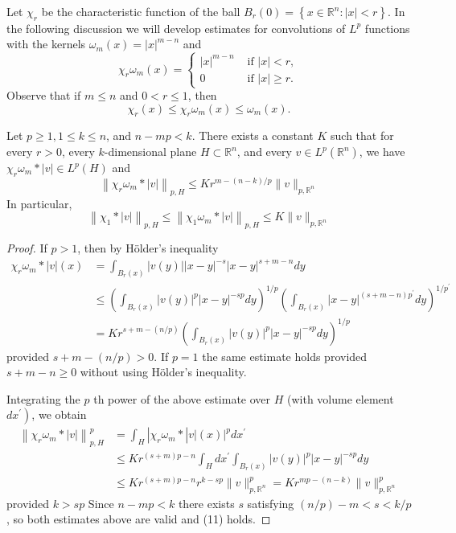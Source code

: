 Let $\chi_r$ be the characteristic function of the ball $B_r(0)=\left\{x \in \mathbb{R}^n:|x|<r\right\}$.
In the following discussion we will develop estimates for convolutions of $L^p$ functions with the kernels 
$\omega_m(x)=|x|^{m-n}$ and
\[
\chi_r \omega_m(x)= \begin{cases}|x|^{m-n} & \text { if }|x|<r, \\ 0 & \text { if }|x| \geq r .\end{cases}
\]
Observe that if $m \leq n$ and $0<r \leq 1$, then
\[
\chi_r(x) \leq \chi_r \omega_m(x) \leq \omega_m(x).
\]


\begin{lemma}
  Let $p \geq 1,1 \leq k \leq n$, and $n-m p<k$. There exists a constant $K$ such that for every $r>0$,
  every $k$-dimensional plane $H \subset \mathbb{R}^n$, and every $v \in L^p\left(\mathbb{R}^n\right)$,
  we have $\chi_r \omega_m *|v| \in L^p(H)$ and
  \[
  \left\|\chi_r \omega_m *|v|\right\|_{p, H} \leq K r^{m-(n-k) / p}\|v\|_{p, \mathbb{R}^n}
  \]
  In particular,
  \[
  \left\|\chi_1 *|v|\right\|_{p, H} \leq\left\|\chi_1 \omega_m *|v|\right\|_{p, H} \leq K\|v\|_{p, \mathbb{R}^n}
  \]
\end{lemma}

\begin{proof}
  If $p>1$, then by Hölder's inequality
  \[
  \begin{aligned}
  \chi_r \omega_m *|v|(x) & =\int_{B_r(x)}|v(y)||x-y|^{-s}|x-y|^{s+m-n} d y \\
  & \leq\left(\int_{B_r(x)}|v(y)|^p|x-y|^{-s p} d y\right)^{1 / p}\left(\int_{B_r(x)}|x-y|^{(s+m-n) p^{\prime}} d y\right)^{1 / p^{\prime}} \\
  & =K r^{s+m-(n / p)}\left(\int_{B_r(x)}|v(y)|^p|x-y|^{-s p} d y\right)^{1 / p}
  \end{aligned}
  \]
  provided $s+m-(n / p)>0$. If $p=1$ the same estimate holds provided $s+m-n \geq 0$
  without using Hölder's inequality.
  
  Integrating the $p$ th power of the above estimate over $H$ (with volume element $\left.d x^{\prime}\right)$, we obtain
  \[
  \begin{aligned}
  \left\|\chi_r \omega_m *|v|\right\|_{p, H}^p & =\int_H\left|\chi_r \omega_m *\right| v|(x)|^p d x^{\prime} \\
  & \leq K r^{(s+m) p-n} \int_H d x^{\prime} \int_{B_r(x)}|v(y)|^p|x-y|^{-s p} d y \\
  & \leq K r^{(s+m) p-n} r^{k-s p}\|v\|_{p, \mathbb{R}^n}^p=K r^{m p-(n-k)}\|v\|_{p, \mathbb{R}^n}^p
  \end{aligned}
  \]
  provided $k>s p$
  Since $n-m p<k$ there exists $s$ satisfying $(n / p)-m<s<k / p$, so both estimates above are valid and (11) holds.
\end{proof}


